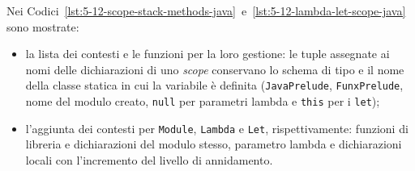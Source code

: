 \newpage

\noindent Nei Codici~\ref{lst:5-12-scope-stack-methods-java}~e~\ref{lst:5-12-lambda-let-scope-java} sono mostrate:
\begin{itemize}
    \item la lista dei contesti e le funzioni per la loro gestione: le tuple assegnate ai nomi delle dichiarazioni di uno \textit{scope}
          conservano lo schema di tipo e il nome della classe statica in cui la variabile è definita
          (\texttt{JavaPrelude}, \texttt{FunxPrelude}, nome del modulo creato,
          \texttt{null} per parametri lambda e \texttt{this} per i \texttt{let});
    \item l'aggiunta dei contesti per \texttt{Module}, \texttt{Lambda} e \texttt{Let}, rispettivamente:
          funzioni di libreria e dichiarazioni del modulo stesso, parametro lambda
          e dichiarazioni locali con l'incremento del livello di annidamento.
\end{itemize}